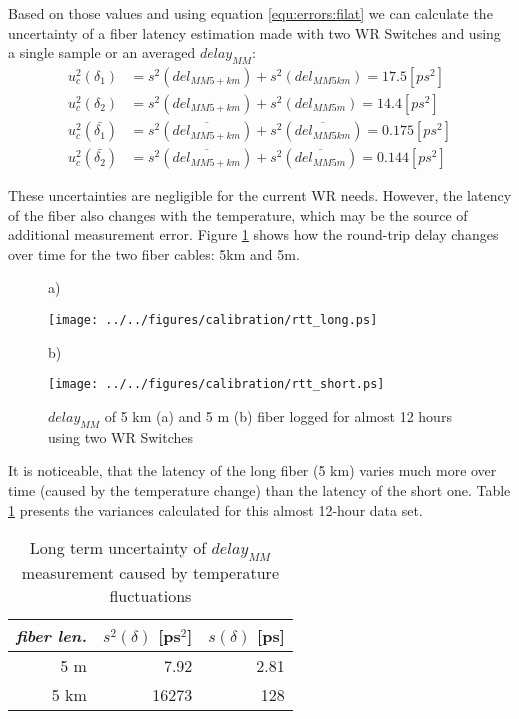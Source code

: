Based on those values and using equation \ref{equ:errors:filat} we can calculate
the uncertainty of a fiber latency estimation made with two WR Switches and
using a single sample or an averaged $delay_{MM}$:
\begin{align}
	\label{equ:errors:f1lat}
  u_c^2(\delta_1) &= s^2(del_{MM5+km}) + s^2(del_{MM5km}) = 17.5 [ps^2]\\
	u_c^2(\delta_2) &= s^2(del_{MM5+km}) + s^2(del_{MM5m}) = 14.4 [ps^2]\\
	u_c^2(\bar{\delta_1}) &= s^2(\overline{del_{MM5+km}}) + s^2(\overline{del_{MM5km}}) = 0.175 [ps^2]\\
	u_c^2(\bar{\delta_2}) &= s^2(\overline{del_{MM5+km}}) + s^2(\overline{del_{MM5m}}) = 0.144 [ps^2]
\end{align}

These uncertainties are negligible for the current WR needs. However, the
latency of the fiber also changes with the temperature, which may be the source
of additional measurement error. Figure \ref{fig:errors:deltemp} shows how the
round-trip delay changes over time for the two fiber cables: 5km and 5m. 

\begin{center}
\begin{figure}[ht]
a)
\begin{minipage}{.5\textwidth}
	\texttt{[image: ../../figures/calibration/rtt\_long.ps]}
\end{minipage}
b)
\begin{minipage}{.5\textwidth}
	\texttt{[image: ../../figures/calibration/rtt\_short.ps]}
\end{minipage}
\caption{$delay_{MM}$ of 5 km (a) and 5 m (b) fiber logged for almost 12 hours using two WR Switches}
\label{fig:errors:deltemp}
\end{figure}
\end{center}

It is noticeable, that the latency of the long fiber (5 km) varies much more
over time (caused by the temperature change) than the latency of the short one.
Table \ref{tab:errors:deltemp} presents the variances calculated for this almost
12-hour data set.
\renewcommand{\arraystretch}{1.2}
\begin{table}[ht]
	\begin{center}
	\begin{tabular}{|r|r|r|}
	\hline
  \emph{fiber len.} & $s^2(\delta)$ [ps$^2$] & $s(\delta)$ [ps]\\
	\hline
	5 m & 7.92 & 2.81\\
	\hline
	5 km & 16273 & 128\\
	\hline
	\end{tabular}
	\caption{Long term uncertainty of $delay_{MM}$ measurement caused by temperature fluctuations}
	\label{tab:errors:deltemp}
	\end{center}
\end{table}
\renewcommand{\arraystretch}{1}


